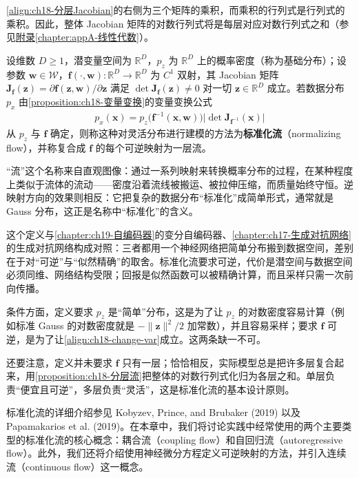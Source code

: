 \documentclass[../main.tex]{subfiles}
\begin{document}
\eqref{align:ch18-分层Jacobian}的右侧为三个矩阵的乘积，而乘积的行列式是行列式的乘积。因此，整体 Jacobian 矩阵的对数行列式将是每层对应对数行列式之和（参见\hyperref[chapter:appA-线性代数]{附录\ref*{chapter:appA-线性代数}}）。

\begin{definition}[标准化流]\label{definition:ch18-标准化流}
设维数 $D\geqslant1$，潜变量空间为 $\mathbb{R}^{D}$，$p_z$ 为 $\mathbb{R}^{D}$ 上的概率密度（称为基础分布）；设参数 $\bm{w}\in\mathcal{W}$，$\bm{f}(\cdot,\bm{w}):\mathbb{R}^{D}\to\mathbb{R}^{D}$ 为 $C^{1}$ 双射，其 Jacobian 矩阵 $\bm{J}_{\bm{f}}(\bm{z})=\partial\bm{f}(\bm{z},\bm{w})/\partial\bm{z}$ 满足 $\det\bm{J}_{\bm{f}}(\bm{z})\neq0$ 对一切 $\bm{z}\in\mathbb{R}^{D}$ 成立。若数据分布 $p_x$ 由\cref{proposition:ch18-变量变换}的变量变换公式
\begin{align*}
  p_x(\bm{x})=p_z\bigl(\bm{f}^{-1}(\bm{x},\bm{w})\bigr)\bigl|\det\bm{J}_{\bm{f}^{-1}}(\bm{x})\bigr|
\end{align*}
从 $p_z$ 与 $\bm{f}$ 确定，则称这种对灵活分布进行建模的方法为\textbf{标准化流}（normalizing flow），并称复合成 $\bm{f}$ 的每个可逆映射为一层流。
\end{definition}

\begin{remark}
“流”这个名称来自直观图像：通过一系列映射来转换概率分布的过程，在某种程度上类似于流体的流动——密度沿着流线被搬运、被拉伸压缩，而质量始终守恒。逆映射方向的效果则相反：它把复杂的数据分布“标准化”成简单形式，通常就是 Gauss 分布，这正是名称中“标准化”的含义。

这个定义与\cref{chapter:ch19-自编码器}的变分自编码器、\cref{chapter:ch17-生成对抗网络}的生成对抗网络构成对照：三者都用一个神经网络把简单分布搬到数据空间，差别在于对“可逆”与“似然精确”的取舍。标准化流要求可逆，代价是潜空间与数据空间必须同维、网络结构受限；回报是似然函数可以被精确计算，而且采样只需一次前向传播。

条件方面，定义要求 $p_z$ 是“简单”分布，这是为了让 $p_z$ 的对数密度容易计算（例如标准 Gauss 的对数密度就是 $-\|\bm{z}\|^{2}/2$ 加常数），并且容易采样；要求 $\bm{f}$ 可逆，是为了让\eqref{align:ch18-change-var}成立。这两条缺一不可。

还要注意，定义并未要求 $\bm{f}$ 只有一层；恰恰相反，实际模型总是把许多层复合起来，用\cref{proposition:ch18-分层流}把整体的对数行列式化归为各层之和。单层负责“便宜且可逆”，多层负责“灵活”，这是标准化流的基本设计原则。
\end{remark}

标准化流的详细介绍参见 Kobyzev, Prince, and Brubaker (2019) 以及 Papamakarios et al. (2019)。在本章中，我们将讨论实践中经常使用的两个主要类型的标准化流的核心概念：耦合流（coupling flow）和自回归流（autoregressive flow）。此外，我们还将介绍使用神经微分方程定义可逆映射的方法，并引入连续流（continuous flow）这一概念。






\end{document}
